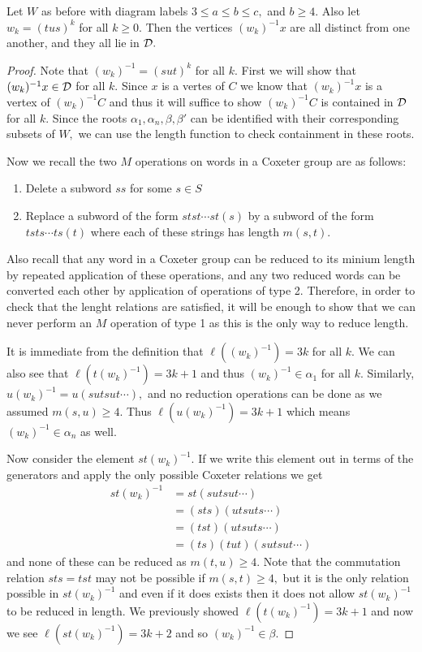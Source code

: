 \documentclass[class=book, crop=false,12 pt]{standalone}
\begin{document}
\begin{lemma}
	\label{lem:infmany}
	Let $W$ as before with diagram labels $3\le a\le b\le c,$ and $b\ge 4.$ Also let $w_k=(tus)^k$ for all $k\ge 0.$ Then the vertices $(w_k)^{-1}x$ are all distinct from one another, and they all lie in $\mathcal{D}.$
\end{lemma}
\begin{proof}
	Note that $(w_k)^{-1}=(sut)^k$ for all $k.$ First we will show that $(w_k)^{-1}x\in \mathcal{D}$ for all $k.$ Since $x$ is a vertes of $C$ we know that $(w_k)^{-1}x$ is a vertex of $(w_k)^{-1}C$ and thus it will suffice to show $(w_k)^{-1}C$ is contained in $\mathcal{D}$ for all $k.$ Since the roots $\alpha_1,\alpha_n,\beta,\beta'$ can be identified with their corresponding subsets of $W,$ we can use the length function to check containment in these roots.

Now we recall the two $M$ operations on words in a Coxeter group are as follows:
\begin{enumerate}
	\item Delete a subword $ss$ for some $s\in S$
	\item Replace a subword of the form $stst\cdots st(s)$ by a subword of the form $tsts\cdots ts(t)$ where each of these strings has length $m(s,t).$
\end{enumerate}
Also recall that any word in a Coxeter group can be reduced to its minium length by repeated application of these operations, and any two reduced words can be converted each other by application of operations of type 2. Therefore, in order to check that the lenght relations are satisfied, it will be enough to show that we can never perform an $M$ operation of type 1 as this is the only way to reduce length.

It is immediate from the definition that $\ell((w_k)^{-1})=3k$ for all $k.$ We can also see that $\ell(t(w_k)^{-1})=3k+1$ and thus $(w_k)^{-1}\in \alpha_1$ for all $k.$ Similarly, $u(w_k)^{-1}=u(sutsut\cdots),$ and no reduction operations can be done as we assumed $m(s,u)\ge 4.$ Thus $\ell(u(w_k)^{-1})=3k+1$ which means $(w_k)^{-1}\in \alpha_n$ as well.

	Now consider the element $st(w_k)^{-1}.$ If we write this element out in terms of the generators and apply the only possible Coxeter relations we get
	\begin{align*}
		st(w_k)^{-1}&=st(sutsut\cdots)\\
		     &=(sts)(utsuts\cdots)\\
		     &=(tst)(utsuts\cdots)\\
		     &=(ts)(tut)(sutsut\cdots)
	\end{align*}
	and none of these can be reduced as $m(t,u)\ge 4.$ Note that the commutation relation $sts=tst$ may not be possible if $m(s,t)\ge 4,$ but it is the only relation possible in $st(w_k)^{-1}$ and even if it does exists then it does not allow $st(w_k)^{-1}$ to be reduced in length. We previously showed $\ell(t(w_k)^{-1})=3k+1$ and now we see $\ell(st(w_k)^{-1})=3k+2$ and so $(w_k)^{-1}\in \beta.$


\end{proof}
\end{document}

